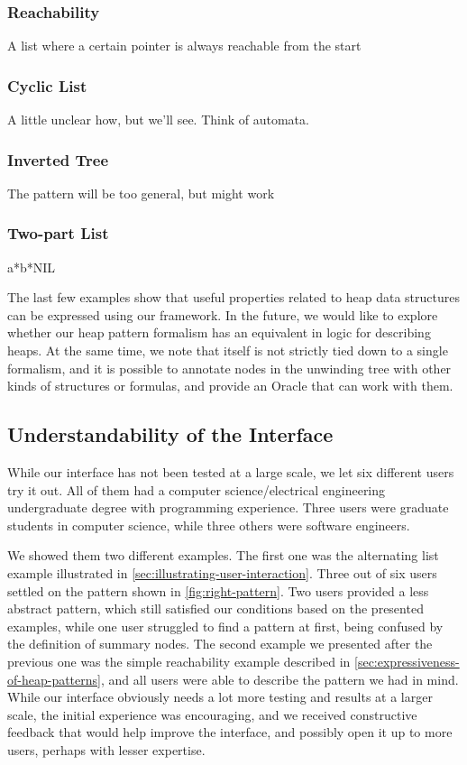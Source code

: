 \subsubsection{Reachability}
A list where a certain pointer is always reachable from the start

\subsubsection{Cyclic List}
A little unclear how, but we'll see. Think of automata.

\subsubsection{Inverted Tree}
The pattern will be too general, but might work

\subsubsection{Two-part List}
a*b*NIL

The last few examples show that useful properties related to heap data structures can be
expressed using our framework. In the future, we would like to explore whether our heap
pattern formalism has an equivalent in logic for describing heaps. At the same time, we
note that \verifier itself is not strictly tied down to a single formalism, and it is
possible to annotate nodes in the unwinding tree with other kinds of structures or
formulas, and provide an Oracle that can work with them.

\subsection{Understandability of the Interface}
\label{sec:understandability-of-interface}
While our interface has not been tested at a large scale, we let six different users try
it out. All of them had a computer science/electrical engineering undergraduate degree
with programming experience. Three users were graduate students in computer science,
while three others were software engineers.

We showed them two different examples. The first one was the alternating list example
illustrated in \autoref{sec:illustrating-user-interaction}. Three out of six users settled
on the pattern shown in \autoref{fig:right-pattern}. Two users provided a less abstract
pattern, which still satisfied our conditions based on the presented examples, while one
user struggled to find a pattern at first, being confused by the definition of summary
nodes. The second example we presented after the previous one was the simple reachability
example described in \autoref{sec:expressiveness-of-heap-patterns}, and all users were
able to describe the pattern we had in mind. While our interface obviously needs a lot
more testing and results at a larger scale, the initial experience was encouraging, and
we received constructive feedback that would help improve the interface, and possibly
open it up to more users, perhaps with lesser expertise.

